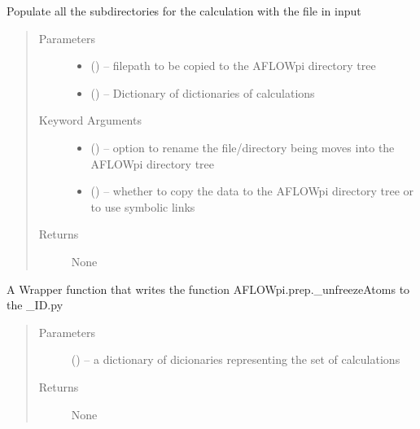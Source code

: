 \documentclass[letterpaper,10pt,english]{sphinxmanual}
\begin{document}
\begin{fulllineitems}
\label{\detokenize{prep:prep.totree}}
Populate all the subdirectories for the calculation with the file in input
\begin{quote}\begin{description}
\item[{Parameters}] \leavevmode\begin{itemize}
\item {} 
 () -- filepath to be copied to the AFLOWpi directory tree

\item {} 
 () -- Dictionary of dictionaries of calculations

\end{itemize}

\item[{Keyword Arguments}] \leavevmode\begin{itemize}
\item {} 
 () -- option to rename the file/directory being moves into the AFLOWpi
directory tree

\item {} 
 () -- whether to copy the data to the AFLOWpi directory tree or
to use symbolic links

\end{itemize}

\item[{Returns}] \leavevmode
None

\end{description}\end{quote}

\end{fulllineitems}


\begin{fulllineitems}
\label{\detokenize{prep:prep.unlockAtomMovement}}
A Wrapper function that writes the function AFLOWpi.prep.\_unfreezeAtoms to the \_ID.py
\begin{quote}\begin{description}
\item[{Parameters}] \leavevmode
{} () -- a dictionary of dicionaries representing the set of calculations

\item[{Returns}] \leavevmode
None

\end{description}\end{quote}

\end{fulllineitems}
\end{document}
